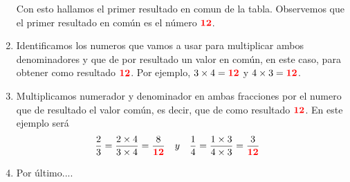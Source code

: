 \documentclass[12pt]{examdesign}
\theoremstyle{plain}
\theoremstyle{definition}
\theoremstyle{remark}
\begin{document}
\begin{endmatter}
\begin{enumerate}
			Con esto hallamos el primer resultado en comun de la tabla. Observemos que el primer resultado en común es el número ${\color{red}{\textbf{12}}}$.
			
			\item Identificamos los numeros que vamos a usar para multiplicar ambos denominadores y que de por resultado un valor en común, en este caso, para obtener como resultado ${\color{red}{\textbf{12}}}$. Por ejemplo,  $3\times 4 = {\color{red}{\textbf{12}}}$ y $4\times 3 = {\color{red}{\textbf{12}}}$.
			
			\item Multiplicamos numerador y denominador en ambas fracciones por el numero que de resultado el valor común, es decir, que de como resultado ${\color{red}{\textbf{12}}}$.
			En este ejemplo será
			\begin{align*}
			    \frac{2}{3}&=\frac{2\times 4}{3\times 4}=\frac{8}{{\color{red}{\textbf{12}}}}&&y&\frac{1}{4}&=\frac{1\times 3}{4\times 3}=\frac{3}{{\color{red}{\textbf{12}}}}
			\end{align*}
			
			
			\item Por último.... 
			

\end{enumerate}
\end{endmatter}
\end{document}
